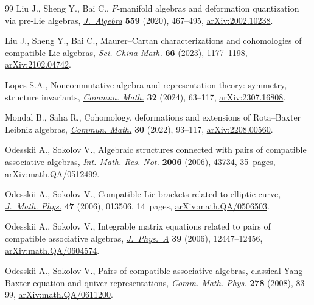 \begin{thebibliography}{99}
Liu J., Sheng Y., Bai C., {$F$}-manifold algebras and deformation quantization
 via pre-{L}ie algebras, \href{https://doi.org/10.1016/j.jalgebra.2020.04.029}{\textit{J.~Algebra}} \textbf{559} (2020), 467--495,
 \href{https://arxiv.org/abs/2002.10238}{arXiv:2002.10238}.

Liu J., Sheng Y., Bai C., Maurer--{C}artan characterizations and cohomologies
 of compatible {L}ie algebras, \href{https://doi.org/10.1007/s11425-021-2014-5}{\textit{Sci. China Math.}} \textbf{66} (2023),
 1177--1198, \href{https://arxiv.org/abs/2102.04742}{arXiv:2102.04742}.

Lopes S.A., Noncommutative algebra and representation theory: symmetry,
 structure invariants, \href{https://doi.org/10.46298/cm.11678}{\textit{Commun. Math.}} \textbf{32} (2024), 63--117,
 \href{https://arxiv.org/abs/2307.16808}{arXiv:2307.16808}.

Mondal B., Saha R., Cohomology, deformations and extensions of {R}ota--{B}axter
 {L}eibniz algebras, \href{https://doi.org/10.46298/cm.10295}{\textit{Commun. Math.}} \textbf{30} (2022), 93--117,
 \href{https://arxiv.org/abs/2208.00560}{arXiv:2208.00560}.

Odesskii A., Sokolov V., Algebraic structures connected with pairs of
 compatible associative algebras, \href{https://doi.org/10.1155/IMRN/2006/43734}{\textit{Int. Math. Res. Not.}} \textbf{2006}
 (2006), 43734, 35~pages, \href{https://arxiv.org/abs/math.QA/0512499}{arXiv:math.QA/0512499}.

Odesskii A., Sokolov V., Compatible {L}ie brackets related to elliptic curve,
 \href{https://doi.org/10.1063/1.2158434}{\textit{J.~Math. Phys.}} \textbf{47} (2006), 013506, 14~pages,
 \href{https://arxiv.org/abs/math.QA/0506503}{arXiv:math.QA/0506503}.

Odesskii A., Sokolov V., Integrable matrix equations related to pairs of
 compatible associative algebras, \href{https://doi.org/10.1088/0305-4470/39/40/011}{\textit{J.~Phys.~A}} \textbf{39} (2006),
 12447--12456, \href{https://arxiv.org/abs/math.QA/0604574}{arXiv:math.QA/0604574}.

Odesskii A., Sokolov V., Pairs of compatible associative algebras, classical
 {Y}ang--{B}axter equation and quiver representations, \href{https://doi.org/10.1007/s00220-007-0361-9}{\textit{Comm. Math.
 Phys.}} \textbf{278} (2008), 83--99, \href{https://arxiv.org/abs/math.QA/0611200}{arXiv:math.QA/0611200}.


\end{thebibliography}

